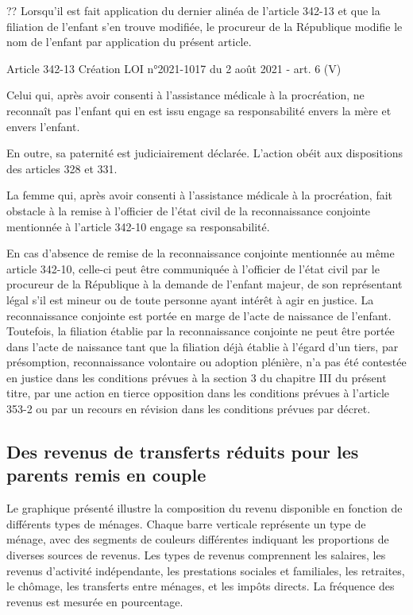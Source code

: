 \documentclass[
  12pt,
]{book}
\begin{document}
\begin{encadre}{??}
Lorsqu'il est fait application du dernier alinéa de l'article 342-13 et que la filiation de l'enfant s'en trouve modifiée, le procureur de la République modifie le nom de l'enfant par application du présent article.

Article 342-13
Création LOI n°2021-1017 du 2 août 2021 - art. 6 (V)

Celui qui, après avoir consenti à l'assistance médicale à la procréation, ne reconnaît pas l'enfant qui en est issu engage sa responsabilité envers la mère et envers l'enfant.

En outre, sa paternité est judiciairement déclarée. L'action obéit aux dispositions des articles 328 et 331.

La femme qui, après avoir consenti à l'assistance médicale à la procréation, fait obstacle à la remise à l'officier de l'état civil de la reconnaissance conjointe mentionnée à l'article 342-10 engage sa responsabilité.

En cas d'absence de remise de la reconnaissance conjointe mentionnée au même article 342-10, celle-ci peut être communiquée à l'officier de l'état civil par le procureur de la République à la demande de l'enfant majeur, de son représentant légal s'il est mineur ou de toute personne ayant intérêt à agir en justice. La reconnaissance conjointe est portée en marge de l'acte de naissance de l'enfant. Toutefois, la filiation établie par la reconnaissance conjointe ne peut être portée dans l'acte de naissance tant que la filiation déjà établie à l'égard d'un tiers, par présomption, reconnaissance volontaire ou adoption plénière, n'a pas été contestée en justice dans les conditions prévues à la section 3 du chapitre III du présent titre, par une action en tierce opposition dans les conditions prévues à l'article 353-2 ou par un recours en révision dans les conditions prévues par décret.

\end{encadre}

\subsection{Des revenus de transferts réduits pour les parents remis en
couple}\label{des-revenus-de-transferts-ruxe9duits-pour-les-parents-remis-en-couple}

Le graphique présenté illustre la composition du revenu disponible en
fonction de différents types de ménages. Chaque barre verticale
représente un type de ménage, avec des segments de couleurs différentes
indiquant les proportions de diverses sources de revenus. Les types de
revenus comprennent les salaires, les revenus d'activité indépendante,
les prestations sociales et familiales, les retraites, le chômage, les
transferts entre ménages, et les impôts directs. La fréquence des
revenus est mesurée en pourcentage.
\end{document}
